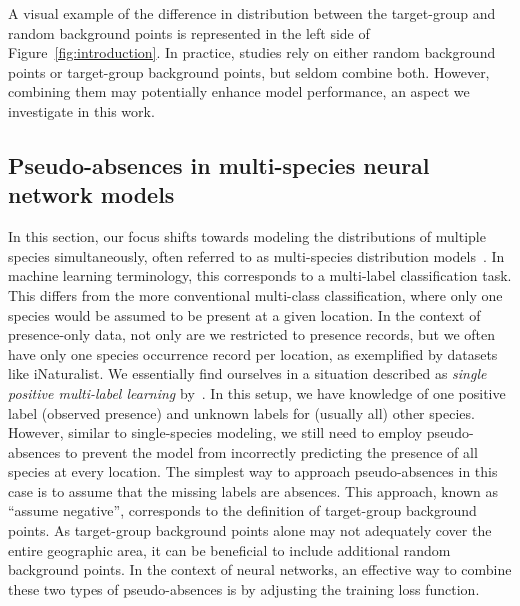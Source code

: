 \documentclass[3p,preprint,12pt]{elsarticle}
\begin{document}
A visual example of the difference in distribution between the target-group and random background points is represented in the left side of Figure~\ref{fig:introduction}.
In practice, studies rely on either random background points or target-group background points, but seldom combine both. However, combining them may potentially enhance model performance, an aspect we investigate in this work.

\subsection{Pseudo-absences in multi-species neural network models}
\label{sec:background_multi}


In this section, our focus shifts towards modeling the distributions of multiple species simultaneously, often referred to as multi-species distribution models~\citep{poggiato2021interpretations}. In machine learning terminology, this corresponds to a multi-label classification task. This differs from the more conventional multi-class classification, where only one species would be assumed to be present at a given location.
In the context of presence-only data, not only are we restricted to presence records, but we often have only one species occurrence record per location, as exemplified by datasets like iNaturalist. We essentially find ourselves in a situation described as \textit{single positive multi-label learning} by~\cite{cole2021multilabel}. In this setup, we have knowledge of one positive label (observed presence) and unknown labels for (usually all) other species. However, similar to single-species modeling, we still need to employ pseudo-absences to prevent the model from incorrectly predicting the presence of all species at every location. 
The simplest way to approach pseudo-absences in this case is to assume that the missing labels are absences. This approach, known as ``assume negative'', corresponds to the definition of target-group background points. As target-group background points alone may not adequately cover the entire geographic area, it can be beneficial to include additional random background points. In the context of neural networks, an effective way to combine these two types of pseudo-absences is by adjusting the training loss function.
\end{document}
